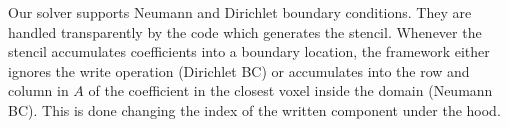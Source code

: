 Our solver supports Neumann and Dirichlet boundary conditions. They are handled transparently by the code which generates the stencil. Whenever the stencil accumulates coefficients into a boundary location, the framework either ignores the write operation (Dirichlet BC) or accumulates into the row and column in $A$ of the coefficient in the closest voxel inside the domain (Neumann BC). This is done changing the index of the written component under the hood.











